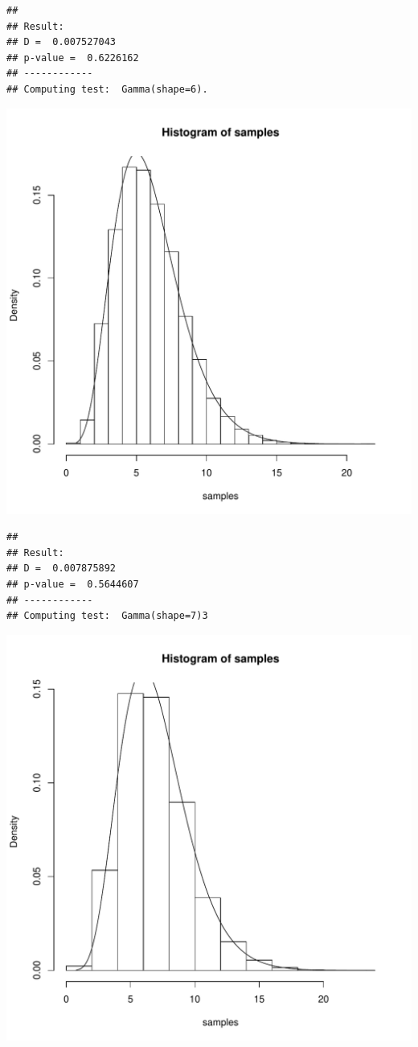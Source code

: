 \documentclass{llncs}\usepackage[]{graphicx}\usepackage[]{color}
\makeatletter
\def\maxwidth{ %
  \ifdim\Gin@nat@width>\linewidth
    \linewidth
  \else
    \Gin@nat@width
  \fi
}
\newenvironment{kframe}{%
 \def\at@end@of@kframe{}%
 \ifinner\ifhmode%
  \def\at@end@of@kframe{\end{minipage}}%
  \begin{minipage}{\columnwidth}%
 \fi\fi%
 \def\FrameCommand##1{\hskip\@totalleftmargin \hskip-\fboxsep
 \colorbox{shadecolor}{##1}\hskip-\fboxsep
     \hskip-\linewidth \hskip-\@totalleftmargin \hskip\columnwidth}%
 \MakeFramed {\advance\hsize-\width
   \@totalleftmargin\z@ \linewidth\hsize
   \@setminipage}}%
 {\par\unskip\endMakeFramed%
 \at@end@of@kframe}
\newenvironment{knitrout}{}{} %
\makeatother
\begin{document}
\begin{knitrout}
\begin{kframe}\begin{lstlisting}[basicstyle=\ttfamily,breaklines=true]
## 
## Result:
## D =  0.007527043 
## p-value =  0.6226162 
## ------------
## Computing test:  Gamma(shape=6).
\end{lstlisting}
\end{kframe}
\includegraphics[width=\maxwidth]{figure/Rt-14} 
\begin{kframe}\begin{lstlisting}[basicstyle=\ttfamily,breaklines=true]
## 
## Result:
## D =  0.007875892 
## p-value =  0.5644607 
## ------------
## Computing test:  Gamma(shape=7)3
\end{lstlisting}
\end{kframe}
\includegraphics[width=\maxwidth]{figure/Rt-15} 

\end{knitrout}
\end{document}
